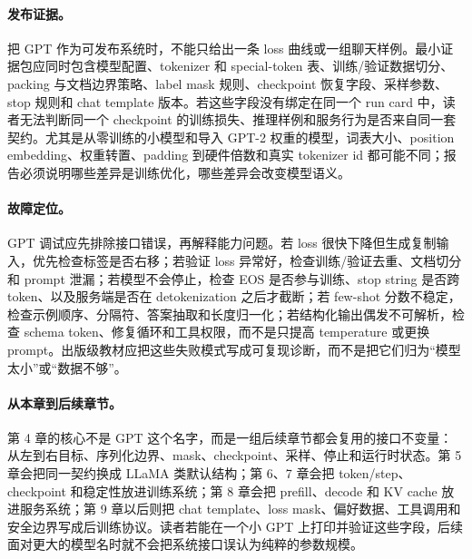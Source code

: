 \documentclass[UTF8,zihao=-4,openany]{ctexbook}
\begin{document}
\paragraph{发布证据。}
把 GPT 作为可发布系统时，不能只给出一条 loss 曲线或一组聊天样例。最小证据包应同时包含模型配置、tokenizer 和 special-token 表、训练/验证数据切分、packing 与文档边界策略、label mask 规则、checkpoint 恢复字段、采样参数、stop 规则和 chat template 版本。若这些字段没有绑定在同一个 run card 中，读者无法判断同一个 checkpoint 的训练损失、推理样例和服务行为是否来自同一套契约。尤其是从零训练的小模型和导入 GPT-2 权重的模型，词表大小、position embedding、权重转置、padding 到硬件倍数和真实 tokenizer id 都可能不同；报告必须说明哪些差异是训练优化，哪些差异会改变模型语义。

\paragraph{故障定位。}
GPT 调试应先排除接口错误，再解释能力问题。若 loss 很快下降但生成复制输入，优先检查标签是否右移；若验证 loss 异常好，检查训练/验证去重、文档切分和 prompt 泄漏；若模型不会停止，检查 EOS 是否参与训练、stop string 是否跨 token、以及服务端是否在 detokenization 之后才截断；若 few-shot 分数不稳定，检查示例顺序、分隔符、答案抽取和长度归一化；若结构化输出偶发不可解析，检查 schema token、修复循环和工具权限，而不是只提高 temperature 或更换 prompt。出版级教材应把这些失败模式写成可复现诊断，而不是把它们归为“模型太小”或“数据不够”。

\paragraph{从本章到后续章节。}
第 4 章的核心不是 GPT 这个名字，而是一组后续章节都会复用的接口不变量：从左到右目标、序列化边界、mask、checkpoint、采样、停止和运行时状态。第 5 章会把同一契约换成 LLaMA 类默认结构；第 6、7 章会把 token/step、checkpoint 和稳定性放进训练系统；第 8 章会把 prefill、decode 和 KV cache 放进服务系统；第 9 章以后则把 chat template、loss mask、偏好数据、工具调用和安全边界写成后训练协议。读者若能在一个小 GPT 上打印并验证这些字段，后续面对更大的模型名时就不会把系统接口误认为纯粹的参数规模。
\end{document}
